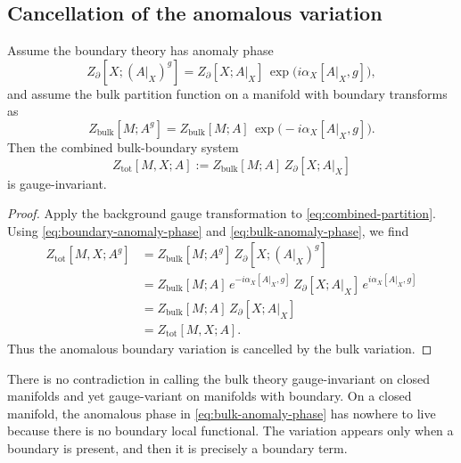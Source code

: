 \subsection{Cancellation of the anomalous variation}

\begin{proposition}\label{prop:general-inflow}
Assume the boundary theory has anomaly phase
\begin{equation}\label{eq:boundary-anomaly-phase}
Z_{\partial}[X;(A|_X)^g]
=
Z_{\partial}[X;A|_X]\,
\exp\!\bigl(i\alpha_X[A|_X,g]\bigr),
\end{equation}
and assume the bulk partition function on a manifold with boundary transforms as
\begin{equation}\label{eq:bulk-anomaly-phase}
Z_{\mathrm{bulk}}[M;A^g]
=
Z_{\mathrm{bulk}}[M;A]\,
\exp\!\bigl(-i\alpha_X[A|_X,g]\bigr).
\end{equation}
Then the combined bulk-boundary system
\begin{equation}\label{eq:combined-partition}
Z_{\mathrm{tot}}[M,X;A]
:=
Z_{\mathrm{bulk}}[M;A]\,
Z_{\partial}[X;A|_X]
\end{equation}
is gauge-invariant.
\end{proposition}

\begin{proof}
Apply the background gauge transformation to \eqref{eq:combined-partition}. Using \eqref{eq:boundary-anomaly-phase} and \eqref{eq:bulk-anomaly-phase}, we find
\begin{align*}
Z_{\mathrm{tot}}[M,X;A^g]
&=
Z_{\mathrm{bulk}}[M;A^g]\,
Z_{\partial}[X;(A|_X)^g] \\
&=
Z_{\mathrm{bulk}}[M;A]\,
e^{-i\alpha_X[A|_X,g]}\,
Z_{\partial}[X;A|_X]\,
e^{i\alpha_X[A|_X,g]} \\
&=
Z_{\mathrm{bulk}}[M;A]\,
Z_{\partial}[X;A|_X] \\
&=
Z_{\mathrm{tot}}[M,X;A].
\end{align*}
Thus the anomalous boundary variation is cancelled by the bulk variation.
\end{proof}

\begin{remark}\label{rem:bulk-closed-vs-boundary}
There is no contradiction in calling the bulk theory gauge-invariant on closed manifolds and yet gauge-variant on manifolds with boundary. On a closed manifold, the anomalous phase in \eqref{eq:bulk-anomaly-phase} has nowhere to live because there is no boundary local functional. The variation appears only when a boundary is present, and then it is precisely a boundary term.
\end{remark}

